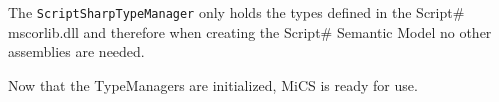 The \texttt{ScriptSharpTypeManager} only holds the types defined in the Script\# mscorlib.dll and therefore when creating the Script\# Semantic Model no other assemblies are needed.

Now that the TypeManagers are initialized, MiCS is ready for use.







































